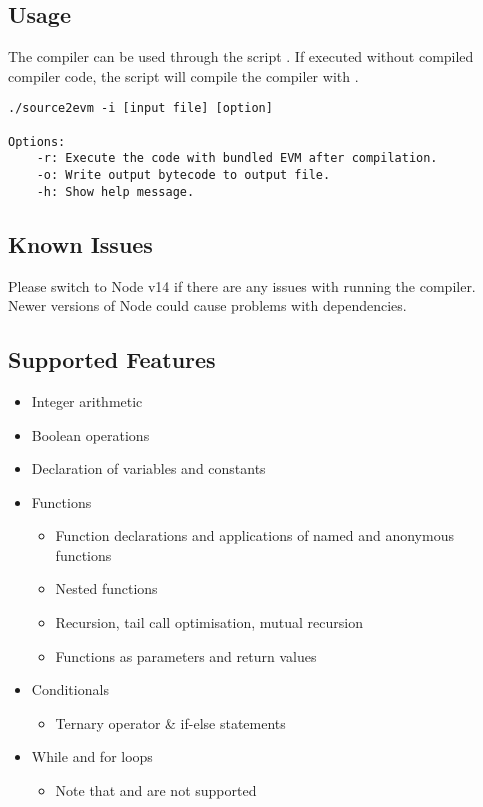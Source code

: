\subsection{Usage}
The compiler can be used through the  script . If executed without compiled compiler code, the script will compile the compiler with . 
\begin{verbatim}
./source2evm -i [input file] [option]

Options: 
    -r: Execute the code with bundled EVM after compilation. 
    -o: Write output bytecode to output file. 
    -h: Show help message. 
\end{verbatim}

\subsection{Known Issues}
Please switch to Node v14 if there are any issues with running the compiler. Newer versions of Node could cause problems with dependencies. 

\subsection{Supported Features}
\begin{itemize}
  \item Integer arithmetic
  \item Boolean operations
  \item Declaration of variables and constants
  \item Functions
    \begin{itemize}
      \item Function declarations and applications of named and anonymous functions
      \item Nested functions
      \item Recursion, tail call optimisation, mutual recursion
      \item Functions as parameters and return values
    \end{itemize}
  \item Conditionals
    \begin{itemize}
      \item Ternary operator \& if-else statements
    \end{itemize}
  \item While and for loops
    \begin{itemize}
      \item Note that  and  are not supported
    \end{itemize}
\end{itemize}

